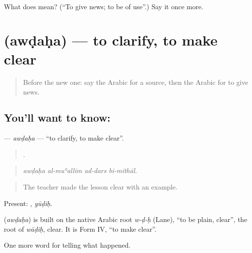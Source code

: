 \begin{tcolorbox}[breakable,colback=teal!4,colframe=teal!35!black,title={Before you move on}]
What does  mean? (\textquotedblleft{}To give news; to be of use\textquotedblright{}.) Say it once more.
\end{tcolorbox}
\section[\texorpdfstring{\ar{أوضح} (awḍaḥa)}{أوضح (awḍaḥa)}]{ (awḍaḥa) — to clarify, to make clear}

\label{lesson:AR-C320-awdaha}



\begin{quote}
Before the new one: say the Arabic for a source, then the Arabic for to give news.
\end{quote}

\subsection*{You'll want to know: }
\textbf{} — \emph{awḍaḥa} — \textquotedblleft{}to clarify, to make clear\textquotedblright{}.

\begin{quote}
   .
\end{quote}

\begin{quote}
\emph{awḍaḥa al-muʿallim ad-dars bi-mithāl.}
\end{quote}

\begin{quote}
The teacher made the lesson clear with an example.
\end{quote}

Present: , \emph{yūḍiḥ}.

\begin{cousinweb}
\textbf{} (\emph{awḍaḥa}) is built on the native Arabic root \emph{w-ḍ-ḥ} (Lane), \textquotedblleft{}to be plain, clear\textquotedblright{}, the root of \emph{wāḍiḥ}, clear. It is Form IV, \textquotedblleft{}to make clear\textquotedblright{}.
\end{cousinweb}

\begin{grammarlens}[title={What you've built}]
One more word for telling what happened.
\end{grammarlens}

